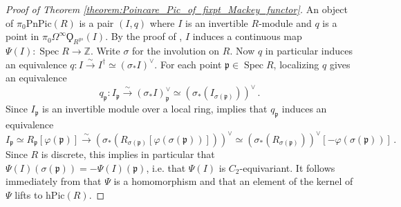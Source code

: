 \documentclass{article}
\DeclareMathOperator{\Spec}{Spec}
\renewcommand{\phi}{\varphi}
\newcommand{\ZZ}{\mathbb{Z}}
\newcommand{\pnpic}{\ensuremath{\mathrm{PnPic}}}
\theoremstyle{definition}
\begin{document}
\begin{proof} [Proof of Theorem \ref{theorem:Poincare_Pic_of_fixpt_Mackey_functor}]
    An object of $ \pi_0 \pnpic(R) $ is a pair $ (I, q) $ where $ I $ is an invertible $ R$-module and $ q $ is a point in $ \pi_0 \Omega^\infty \Qoppa_{R^{gs}}(I) $. 
    By the proof of \cite[Theorem 3.5]{MR1966659}, $ I $ induces a continuous map $ \Psi(I) \colon \Spec R \to \ZZ $. 
    Write $ \sigma $ for the involution on $ R $. 
    Now $ q $ in particular induces an equivalence $ q \colon I \xrightarrow{\sim} I^\dag \simeq (\sigma_*I)^\vee $. 
    For each point $ \mathfrak{p} \in \Spec R $, localizing $ q $ gives an equivalence
    \begin{equation*}
        q_{\mathfrak{p}} \colon I_{\mathfrak{p}} \xrightarrow{\sim} (\sigma_*I)^\vee_{\mathfrak{p}} \simeq \left(\sigma_*(I_{\sigma(\mathfrak{p})})\right)^\vee \,.
    \end{equation*}
    Since $ I_{\mathfrak{p}} $ is an invertible module over a local ring, \cite[Proposition 3.2]{MR1966659} implies that $ q_{\mathfrak{p}} $ induces an equivalence
    \begin{equation*}
        I_{\mathfrak{p}} \simeq R_{\mathfrak{p}}[\phi(\mathfrak{p})] \xrightarrow{\sim} \left(\sigma_*(R_{\sigma(\mathfrak{p})}[\phi(\sigma(\mathfrak{p}))])\right)^\vee \simeq (\sigma_*(R_{\sigma(\mathfrak{p})}))^\vee [-\phi(\sigma(\mathfrak{p}))] \,.
    \end{equation*}
    Since $ R $ is discrete, this implies in particular that $ \Psi(I)(\sigma(\mathfrak{p})) = -\Psi(I)(\mathfrak{p}) $, i.e. that $ \Psi(I) $ is $ C_2 $-equivariant. 
    It follows immediately from \cite[Theorem 3.5]{MR1966659} that $ \Psi $ is a homomorphism and that an element of the kernel of $ \Psi $ lifts to $ \mathrm{hPic}(R) $. 


\end{proof}
\end{document}
